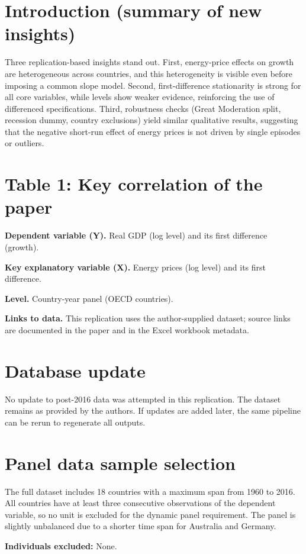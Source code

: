 \documentclass[11pt]{article}
\begin{document}
\section*{Introduction (summary of new insights)}
Three replication-based insights stand out. First, energy-price effects on growth are heterogeneous across countries, and this heterogeneity is visible even before imposing a common slope model. Second, first-difference stationarity is strong for all core variables, while levels show weaker evidence, reinforcing the use of differenced specifications. Third, robustness checks (Great Moderation split, recession dummy, country exclusions) yield similar qualitative results, suggesting that the negative short-run effect of energy prices is not driven by single episodes or outliers.

\section*{Table 1: Key correlation of the paper}
\textbf{Dependent variable (Y).} Real GDP (log level) and its first difference (growth).

\textbf{Key explanatory variable (X).} Energy prices (log level) and its first difference.

\textbf{Level.} Country-year panel (OECD countries).

\textbf{Links to data.} This replication uses the author-supplied dataset; source links are documented in the paper and in the Excel workbook metadata.

\section*{Database update}
No update to post-2016 data was attempted in this replication. The dataset remains as provided by the authors. If updates are added later, the same pipeline can be rerun to regenerate all outputs.

\section*{Panel data sample selection}
The full dataset includes 18 countries with a maximum span from 1960 to 2016. All countries have at least three consecutive observations of the dependent variable, so no unit is excluded for the dynamic panel requirement. The panel is slightly unbalanced due to a shorter time span for Australia and Germany.

\textbf{Individuals excluded:} None.
\end{document}
